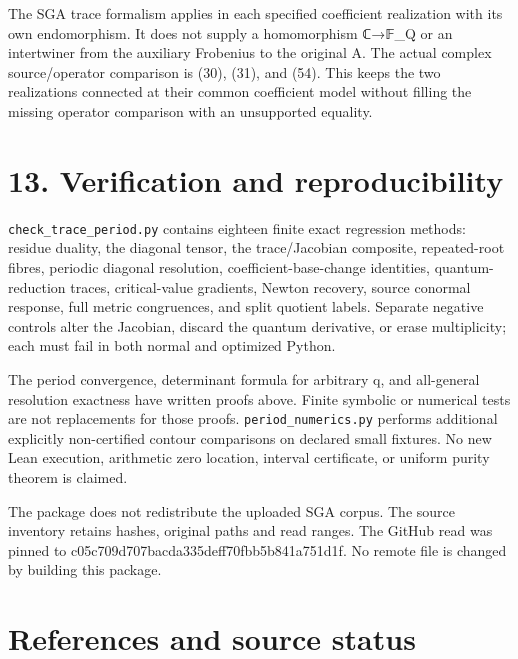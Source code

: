 \documentclass[
  11pt,
]{article}
\begin{document}
The SGA trace formalism applies in each specified coefficient
realization with its own endomorphism. It does not supply a homomorphism
ℂ→𝔽\_Q or an intertwiner from the auxiliary Frobenius to the original A.
The actual complex source/operator comparison is (30), (31), and (54).
This keeps the two realizations connected at their common coefficient
model without filling the missing operator comparison with an
unsupported equality.

\section{13. Verification and
reproducibility}\label{verification-and-reproducibility}

\texttt{check\_trace\_period.py} contains eighteen finite exact
regression methods: residue duality, the diagonal tensor, the
trace/Jacobian composite, repeated-root fibres, periodic diagonal
resolution, coefficient-base-change identities, quantum-reduction
traces, critical-value gradients, Newton recovery, source conormal
response, full metric congruences, and split quotient labels. Separate
negative controls alter the Jacobian, discard the quantum derivative, or
erase multiplicity; each must fail in both normal and optimized Python.

The period convergence, determinant formula for arbitrary q, and
all-general resolution exactness have written proofs above. Finite
symbolic or numerical tests are not replacements for those proofs.
\texttt{period\_numerics.py} performs additional explicitly
non-certified contour comparisons on declared small fixtures. No new
Lean execution, arithmetic zero location, interval certificate, or
uniform purity theorem is claimed.

The package does not redistribute the uploaded SGA corpus. The source
inventory retains hashes, original paths and read ranges. The GitHub
read was pinned to c05c709d707bacda335deff70fbb5b841a751d1f. No remote
file is changed by building this package.

\section{References and source
status}\label{references-and-source-status}
\end{document}
